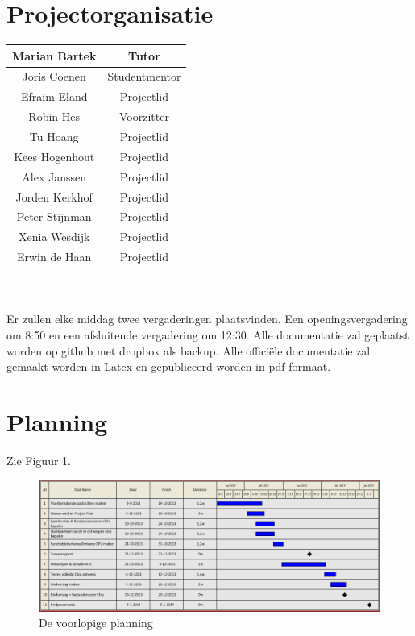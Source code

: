 \documentclass{scrartcl}
\begin{document}
\section{Projectorganisatie}
\begin {tabular}{|c|c|}
\hline
Marian Bartek & Tutor\\
\hline
Joris Coenen & Studentmentor\\
\hline
Efraïm Eland & Projectlid\\
\hline
Robin Hes & Voorzitter\\
\hline
Tu Hoang & Projectlid\\
\hline
Kees Hogenhout & Projectlid\\
\hline
Alex Janssen & Projectlid\\
\hline
Jorden Kerkhof & Projectlid\\
\hline
Peter Stijnman & Projectlid\\
\hline
Xenia Wesdijk & Projectlid\\
\hline
Erwin de Haan & Projectlid\\
\hline
\end {tabular}
\\
\\Er zullen elke middag twee vergaderingen plaatsvinden. Een openingsvergadering om 8:50 en een afsluitende vergadering om 12:30.
Alle documentatie zal geplaatst worden op github met dropbox als backup.
Alle officiële documentatie zal gemaakt worden in Latex en gepubliceerd worden in pdf-formaat.
\newpage
\section{Planning}
Zie Figuur 1.
 \begin{figure}[H]
\centering
	\includegraphics[width=18cm]{Planner}
	\caption{De voorlopige planning}
	\label{fig:planning}
\end{figure}
\end{document}
